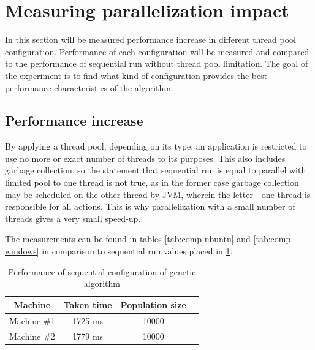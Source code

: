 \section{Measuring parallelization impact}

In this section will be measured performance increase in different thread pool configuration.
Performance of each configuration will be measured and compared to the performance of sequential run without thread pool limitation. The goal of the experiment is to find what kind of configuration provides the best performance characteristics of the algorithm.

\subsection{Performance increase}

By applying a thread pool, depending on its type, an application is restricted to use no more or exact number of threads to its purposes. This also includes garbage collection, so the statement that sequential run is equal to parallel with limited pool to one thread is not true, as in the former case garbage collection may be scheduled on the other thread by JVM, wherein the letter - one thread is responsible for all actions. This is why parallelization with a small number of threads gives a very small speed-up.

The measurements can be found in tables \ref{tab:comp-ubuntu} and \ref{tab:comp-windows} in comparison to sequential run values placed in \ref{tab:win-ub-perf}.

\begin{table}[h]
\centering\caption{Performance of sequential configuration of genetic algorithm \label{tab:win-ub-perf}}
\begin{tabular}{|c|c|c|c|}
\hline
\textbf{Machine} & \textbf{Taken time} & \textbf{Population size} \\
\hline
Machine \#1 & 1725 ms & 10000 \\
\hline
Machine \#2 & 1779 ms & 10000 \\
\hline
\end{tabular}
\end{table}

